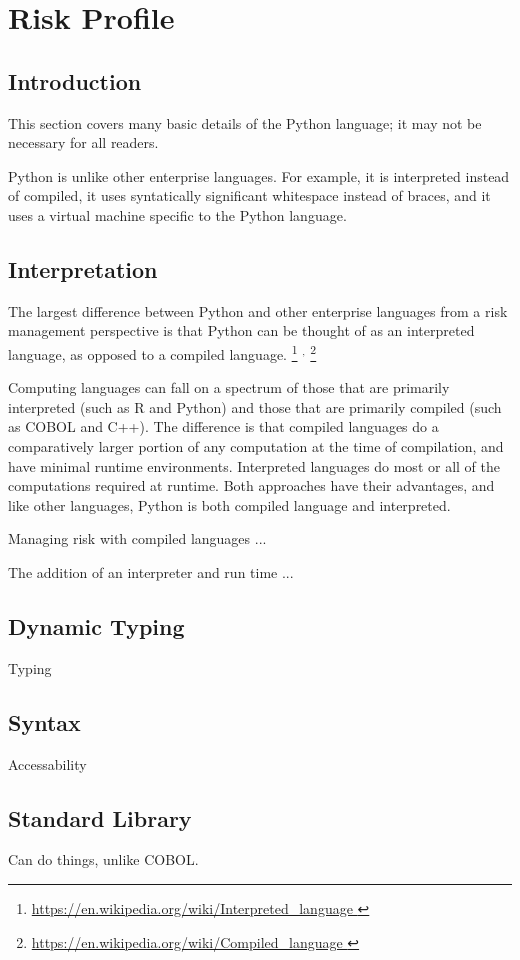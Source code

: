 \section{Risk Profile}

\subsection{Introduction}

\begin{tcolorbox}
	This section covers many basic details of the Python language; it may not be necessary for all readers.
\end{tcolorbox}

Python is unlike other enterprise languages. For example, it is interpreted instead of compiled, it uses syntatically significant whitespace instead of braces, and it uses a virtual machine specific to the Python language. 

\subsection{Interpretation}
	The largest difference between Python and other enterprise languages from a risk management perspective is that Python can be thought of as an interpreted language, as opposed to a compiled language.
	\footnote{
		\url{
			https://en.wikipedia.org/wiki/Interpreted_language
		}
	}
	$^{,}$
	\footnote{
		\url{
			https://en.wikipedia.org/wiki/Compiled_language
		}
	}

	Computing languages can fall on a spectrum of those that are primarily interpreted (such as R and Python) and those that are primarily compiled (such as COBOL and C++). The difference is that compiled languages do a comparatively larger portion of any computation at the time of compilation, and have minimal runtime environments. Interpreted languages do most or all of the computations required at runtime. Both approaches have their advantages, and like other languages, Python is both compiled language and interpreted.

	Managing risk with compiled languages ...

	The addition of an interpreter and run time ...

	
\subsection{Dynamic Typing}

	Typing

\subsection{Syntax}

	Accessability

\subsection{Standard Library}

	Can do things, unlike COBOL.